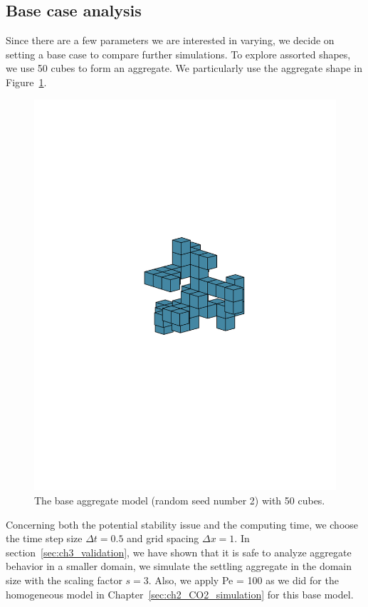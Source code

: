 \subsection{Base case analysis}
Since there are a few parameters we are interested in varying, we decide on setting a base case to compare further simulations. To explore assorted shapes, we use 50 cubes to form an aggregate. We particularly use the aggregate shape in Figure~\ref{fig_NC50_base_seed2}. 
\begin{figure}[ht]
	\begin{center}
		\vspace*{3mm}
		\includegraphics[scale=0.5]{./figures/fig_NC50_seed2}
	\caption{The base aggregate model (random seed number 2) with 50 cubes.}
	\label{fig_NC50_base_seed2}
\end{center}
\end{figure}
Concerning both the potential stability issue and the computing time, we choose the time step size $\Delta t = 0.5$ and grid spacing $\Delta x =1$. In section~\ref{sec:ch3_validation}, we have shown that it is safe to analyze aggregate behavior in a smaller domain, we simulate the settling aggregate in the domain size with the scaling factor $s = 3$.  Also, we apply Pe = 100 as we did for the homogeneous model in Chapter~\ref{sec:ch2_CO2_simulation} for this base model.
